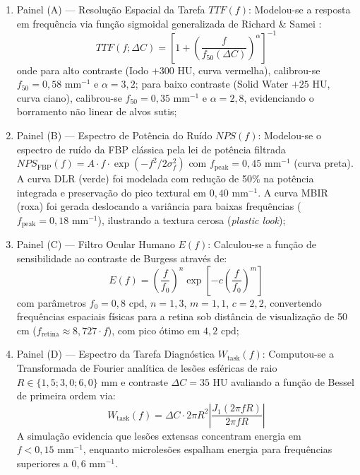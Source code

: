 \documentclass[
  12pt,
  a4paper,
  oneside
]{report}
\begin{document}
\begin{enumerate}
  \item Painel (A) --- Resolução Espacial da Tarefa $TTF(f)$:
  Modelou-se a resposta em frequência via função sigmoidal generalizada de Richard \& Samei \cite{racine2020}:
  \begin{equation}
    TTF(f; \Delta C) = \left[ 1 + \left( \frac{f}{f_{50}(\Delta C)} \right)^\alpha \right]^{-1}
  \end{equation}
  onde para alto contraste (Iodo $+300\text{ HU}$, curva vermelha), calibrou-se $f_{50} = 0{,}58\text{ mm}^{-1}$ e $\alpha = 3{,}2$; para baixo contraste (Solid Water $+25\text{ HU}$, curva ciano), calibrou-se $f_{50} = 0{,}35\text{ mm}^{-1}$ e $\alpha = 2{,}8$, evidenciando o borramento não linear de alvos sutis;

  \item Painel (B) --- Espectro de Potência do Ruído $NPS(f)$:
  Modelou-se o espectro de ruído da FBP clássica pela lei de potência filtrada $NPS_{\text{FBP}}(f) = A \cdot f \cdot \exp(-f^2 / 2\sigma_f^2)$ com $f_{\text{peak}} = 0{,}45\text{ mm}^{-1}$ (curva preta). A curva DLR (verde) foi modelada com redução de 50\% na potência integrada e preservação do pico textural em $0{,}40\text{ mm}^{-1}$. A curva MBIR (roxa) foi gerada deslocando a variância para baixas frequências ($f_{\text{peak}} = 0{,}18\text{ mm}^{-1}$), ilustrando a textura cerosa (\emph{plastic look});

  \item Painel (C) --- Filtro Ocular Humano $E(f)$:
  Calculou-se a função de sensibilidade ao contraste de Burgess \cite{burgess1999} através de:
  \begin{equation}
    E(f) = \left( \frac{f}{f_0} \right)^n \exp\left[ -c \left( \frac{f}{f_0} \right)^m \right]
    \label{eq:filtro_ocular_burgess}
  \end{equation}
  com parâmetros $f_0 = 0{,}8\text{ cpd}$, $n = 1{,}3$, $m = 1{,}1$, $c = 2{,}2$, convertendo frequências espaciais físicas para a retina sob distância de visualização de 50 cm ($f_{\text{retina}} \approx 8{,}727 \cdot f$), com pico ótimo em $4{,}2\text{ cpd}$;

  \item Painel (D) --- Espectro da Tarefa Diagnóstica $W_{\text{task}}(f)$:
  Computou-se a Transformada de Fourier analítica de lesões esféricas de raio $R \in \{1{,}5; 3{,}0; 6{,}0\}\text{ mm}$ e contraste $\Delta C = 35\text{ HU}$ avaliando a função de Bessel de primeira ordem via:
  \begin{equation}
    W_{\text{task}}(f) = \Delta C \cdot 2\pi R^2 \left| \frac{J_1(2\pi f R)}{2\pi f R} \right|
    \label{eq:wtask_bessel_formula}
  \end{equation}
  A simulação evidencia que lesões extensas concentram energia em $f < 0{,}15\text{ mm}^{-1}$, enquanto microlesões espalham energia para frequências superiores a $0{,}6\text{ mm}^{-1}$.
\end{enumerate}
\end{document}
